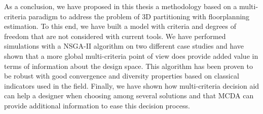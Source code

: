 As a conclusion, we have proposed in this thesis a methodology based on a multi-criteria paradigm to address the problem of 3D partitioning with floorplanning estimation. To this end, we have built a model with criteria and degrees of freedom that are not considered with current tools. We have performed simulations with a NSGA-II algorithm on two different case studies and have shown that a more global multi-criteria point of view does provide added value in terms of information about the design space. This algorithm has been proven to be robust with good convergence and diversity properties based on classical indicators used in the field. Finally, we have shown how multi-criteria decision aid can help a designer when choosing among several solutions and that MCDA can provide additional information to ease this decision process. %